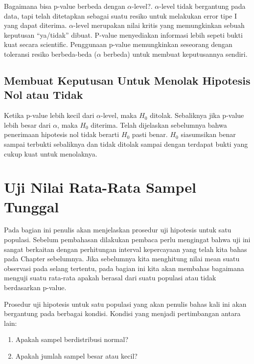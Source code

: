 \documentclass[]{book}
\providecommand{\tightlist}{%
  \setlength{\itemsep}{0pt}\setlength{\parskip}{0pt}}
\begin{document}
Bagaimana bisa p-value berbeda dengan \(\alpha\)-level?.
\(\alpha\)-level tidak bergantung pada data, tapi telah ditetapkan
sebagai suatu resiko untuk melakukan error tipe I yang dapat diterima.
\(\alpha\)-level merupakan nilai kritis yang memungkinkan sebuah
keputusan ``ya/tidak'' dibuat. P-value menyediakan informasi lebih
sepeti bukti kuat secara scientific. Penggunaan p-value memungkinkan
seseorang dengan toleransi resiko berbeda-beda (\(\alpha\) berbeda)
untuk membuat keputusannya sendiri.

\subsection{Membuat Keputusan Untuk Menolak Hipotesis Nol atau
Tidak}\label{membuat-keputusan-untuk-menolak-hipotesis-nol-atau-tidak}

Ketika p-value lebih kecil dari \(\alpha\)-level, maka \(H_0\) ditolak.
Sebaliknya jika p-value lebih besar dari \(\alpha\), maka \(H_0\)
diterima. Telah dijelaskan sebelumnya bahwa penerimaan hipotesis nol
tidak berarti \(H_0\) pasti benar. \(H_0\) siasumsikan benar sampai
terbukti sebaliknya dan tidak ditolak sampai dengan terdapat bukti yang
cukup kuat untuk menolaknya.

\section{Uji Nilai Rata-Rata Sampel
Tunggal}\label{uji-nilai-rata-rata-sampel-tunggal}

Pada bagian ini penulis akan menjelaskan prosedur uji hipotesis untuk
satu populasi. Sebelum pembahasan dilakukan pembaca perlu mengingat
bahwa uji ini sangat berkaitan dengan perhitungan interval kepercayaan
yang telah kita bahas pada Chapter sebelumnya. Jika sebelumnya kita
menghitung nilai mean suatu observasi pada selang tertentu, pada bagian
ini kita akan membahas bagaimana menguji suatu rata-rata apakah berasal
dari suatu populasi atau tidak berdasarkan p-value.

Prosedur uji hipotesis untuk satu populasi yang akan penulis bahas kali
ini akan bergantung pada berbagai kondisi. Kondisi yang menjadi
pertimbangan antara lain:

\begin{enumerate}
\def\labelenumi{\arabic{enumi}.}
\tightlist
\item
  Apakah sampel berdistribusi normal?
\item
  Apakah jumlah sampel besar atau kecil?
\end{enumerate}
\end{document}
